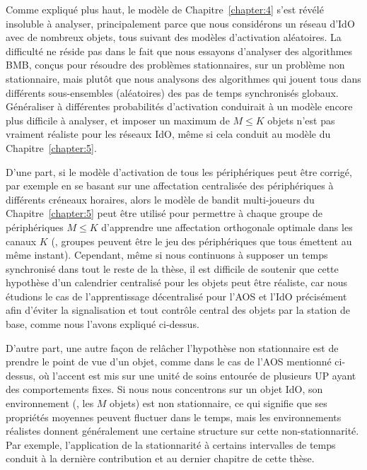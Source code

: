 \begin{resume_fr}
Comme expliqué plus haut, le modèle de Chapitre~\ref{chapter:4} s'est révélé insoluble à analyser, principalement parce que nous considérons un réseau d'IdO avec de nombreux objets, tous suivant des modèles d'activation aléatoires.
La difficulté ne réside pas dans le fait que nous essayons d'analyser des algorithmes BMB, conçus pour résoudre des problèmes stationnaires, sur un problème non stationnaire,
mais plutôt que nous analysons des algorithmes qui jouent tous dans différents sous-ensembles (aléatoires) des pas de temps synchronisés globaux.
Généraliser à différentes probabilités d'activation conduirait à un modèle encore plus difficile à analyser, et imposer un maximum de $M \leq K$ objets n'est pas vraiment réaliste pour les réseaux IdO, même si cela conduit au modèle du Chapitre~\ref{chapter:5}.

D'une part, si le modèle d'activation de tous les périphériques peut être corrigé, par exemple en se basant sur une affectation centralisée des périphériques à différents créneaux horaires, alors le modèle de bandit multi-joueurs du Chapitre~\ref{chapter:5} peut être utilisé pour permettre à chaque groupe de périphériques $M \leq K$ d'apprendre une affectation orthogonale optimale dans les canaux $K$ (\eg, groupes peuvent être le jeu des périphériques que tous émettent au même instant).
%
Cependant, même si nous continuons à supposer un temps synchronisé dans tout le reste de la thèse,
il est difficile de soutenir que cette hypothèse d'un calendrier centralisé pour les objets peut être réaliste, car nous étudions le cas de l'apprentissage décentralisé pour l'AOS et l'IdO précisément afin d'éviter la signalisation et tout contrôle central des objets par la station de base, comme nous l'avons expliqué ci-dessus.

D'autre part, une autre façon de relâcher l'hypothèse non stationnaire est de prendre le point de vue d'un objet, comme dans le cas de l'AOS mentionné ci-dessus, où l'accent est mis sur une unité de soins entourée de plusieurs UP ayant des comportements fixes.
Si nous nous concentrons sur un objet IdO, son environnement (\ie, les $M$ objets) est non stationnaire, ce qui signifie que ses propriétés moyennes peuvent fluctuer dans le temps, mais les environnements réalistes donnent généralement une certaine structure sur cette non-stationnarité.
Par exemple, l'application de la stationnarité à certains intervalles de temps conduit à la dernière contribution et au dernier chapitre de cette thèse.



\end{resume_fr}
